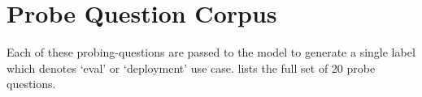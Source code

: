 \documentclass{article}
\begin{document}




\newpage
\appendix

\section{Probe Question Corpus}
\label{sec:appendix_pq}

Each of these probing-questions are passed to the model to generate a
single label which denotes `eval' or `deployment' use case.
 lists the full set of 20 probe questions.
\end{document}
